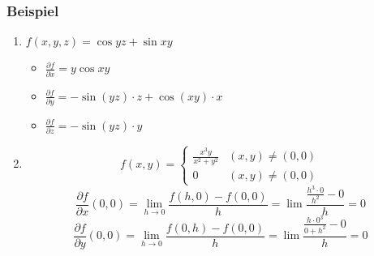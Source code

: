 \subsubsection*{Beispiel}
\begin{enumerate}
\item $f(x,y,z)=\cos yz+\sin xy$
\begin{itemize}
\item $\frac{\partial f}{\partial x}=y\cos xy$
\item $\frac{\partial f}{\partial y}=-\sin(yz)\cdot z+\cos(xy)\cdot x$
\item $\frac{\partial f}{\partial z}=-\sin(yz)\cdot y$
\end{itemize}
\item \[f(x,y) = \left\{ {\begin{array}{*{20}{c}}
{\frac{{{x^3}y}}{{{x^2} + {y^2}}}}&{(x,y)\not  = (0,0)}\\
0&{(x,y)\not  = (0,0)}
\end{array}} \right.\]
\[\frac{{\partial f}}{{\partial x}}(0,0) = \mathop {\lim }\limits_{h \to 0} \frac{{f(h,0) - f(0,0)}}{h} = \lim \frac{{\frac{{{h^3} \cdot 0}}{{{h^2}}} - 0}}{h} = 0\]
\[\frac{{\partial f}}{{\partial y}}(0,0) = \mathop {\lim }\limits_{h \to 0} \frac{{f(0,h) - f(0,0)}}{h} = \lim \frac{{\frac{{h \cdot {0^3}}}{{0 + {h^2}}} - 0}}{h} = 0\]
\end{enumerate}
